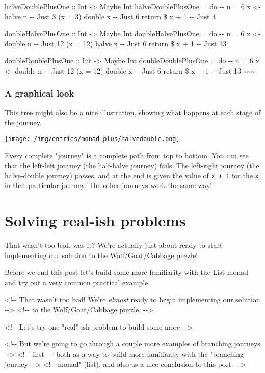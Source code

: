 \documentclass[]{article}
\begin{document}
halveDoublePlusOne :: Int -\textgreater{} Maybe Int halveDoublePlusOne = do -\/-
n = 6 x \textless{}- halve n -\/- Just 3 (x = 3) double x -\/- Just 6 return \$
x + 1 -\/- Just 4

doubleHalvePlusOne :: Int -\textgreater{} Maybe Int doubleHalvePlusOne = do -\/-
n = 6 x \textless{}- double n -\/- Just 12 (x = 12) halve x -\/- Just 6 return
\$ x + 1 -\/- Just 13

doubleDoublePlusOne :: Int -\textgreater{} Maybe Int doubleDoublePlusOne = do
-\/- n = 6 x \textless{}- double n -\/- Just 12 (x = 12) double x -\/- Just 6
return \$ x + 1 -\/- Just 13 \textasciitilde{}\textasciitilde{}\textasciitilde{}

\subsubsection{A graphical look}

This tree might also be a nice illustration, showing what happens at each stage
of the journey.

\texttt{[image: /img/entries/monad-plus/halvedouble.png]}

Every complete "journey" is a complete path from top to bottom. You can see that
the left-left journey (the half-halve journey) fails. The left-right journey
(the halve-double journey) passes, and at the end is given the value of
\texttt{x\ +\ 1} for the \texttt{x} in that particular journey. The other
journeys work the same way!

\section{Solving real-ish problems}

That wasn't too bad, was it? We're actually just about ready to start
implementing our solution to the Wolf/Goat/Cabbage puzzle!

Before we end this post let's build some more familiarity with the List monad
and try out a very common practical example.

\textless{}!-\/- That wasn't too bad! We're \emph{almost} ready to begin
implementing our solution -\/-\textgreater{} \textless{}!-\/- to the
Wolf/Goat/Cabbage puzzle. -\/-\textgreater{}

\textless{}!-\/- Let's try one "real"-ish problem to build some more
-\/-\textgreater{}

\textless{}!-\/- But we're going to go through a couple more examples of
branching journeys -\/-\textgreater{} \textless{}!-\/- first -\/-\/- both as a
way to build more familiarity with the "branching journey -\/-\textgreater{}
\textless{}!-\/- monad" (list), and also as a nice conclusion to this post.
-\/-\textgreater{}
\end{document}
